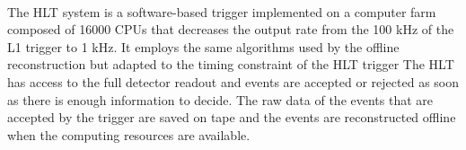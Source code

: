 \\
The HLT system \cite{SphicasCMS:Trigger} is a software-based trigger implemented on a computer farm composed of 16000 CPUs that decreases the output rate from the 100 kHz of the L1 trigger to 1 kHz. It employs the same algorithms used by the offline reconstruction but adapted to the timing constraint of the HLT trigger
The HLT has access to the full detector readout and events are accepted or rejected as soon as there is enough information to decide. The raw data of the events that are accepted by the trigger are saved on tape and the events are reconstructed offline when the computing resources are available.


